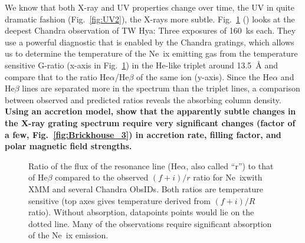 \documentclass[letterpaper,11pt,twocolumn]{article}
\begin{document}
We know that both X-ray and UV properties change over time, the UV in
quite dramatic fashion (Fig.~\ref{fig:UV2}), the X-rays more
subtle. Fig.~\ref{fig:allspec} () looks
at the deepest Chandra observation of TW Hya: Three exposures of
160~ks each. They use a powerful diagnostic that is enabled by the
Chandra gratings, which allows us to determine the temperature of the Ne~{\sc ix}
emitting gas from the temperature sensitive G-ratio  (x-axis in Fig.~\ref{fig:allspec}) in the He-like
triplet around 13.5~\AA{} and compare that to the
ratio He$\alpha$/He$\beta$ of the same ion (y-axis). Since the He$\alpha$ and
He$\beta$ lines are separated more in the spectrum than the triplet
lines, a comparison between observed and predicted ratios reveals the
absorbing column density. \textbf{Using an accretion model,
  \citet{2012ApJ...760L..21B} show that the apparently subtle changes
  in the X-ray grating spectrum require very significant changes
  (factor of a few, Fig.~\ref{fig:Brickhouse_3}) in accretion rate, filling factor, and polar
  magnetic field strengths. }

\begin{figure}[h!]
\centering
{}
\caption{Ratio of the flux of the resonance line (He$\alpha$, also
  called ``r'') to that of He$\beta$ compared to the observed
  $(f+i)/r$ ratio for Ne~{\sc ix}with XMM and several Chandra
  ObsIDs. Both ratios are temperature sensitive (top axes gives
  temperature derived from $(f+i)/R$ ratio). Without absorption,
  datapoints points would lie on the dotted line.  Many of the
  observations require significant absorption of the Ne~{\sc ix}
  emission.
\label{fig:allspec} }
\end{figure}
\end{document}
